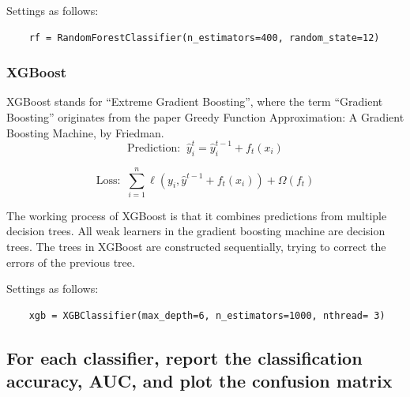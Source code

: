 \documentclass{article}
\begin{document}
Settings as follows:

\begin{lstlisting}
    rf = RandomForestClassifier(n_estimators=400, random_state=12)
\end{lstlisting}

\subsubsection{XGBoost}
XGBoost stands for “Extreme Gradient Boosting”, where the term “Gradient Boosting” originates from the paper Greedy Function Approximation: A Gradient Boosting Machine, by Friedman.
\begin{equation}
    \mbox{Prediction: } \ \hat{y}^{t}_i = \hat{y}^{t-1}_i + f_t(x_i) 
\end{equation}

\begin{equation}
    \mbox{Loss: } \ \sum^{n}_{i=1} \ell(y_i,\hat{y}^{t-1} + f_t(x_i) ) + \Omega(f_t)
\end{equation}

The working process of XGBoost is that it combines predictions from multiple decision trees. All weak learners in the gradient boosting machine are decision trees. The trees in XGBoost are constructed sequentially, trying to correct the errors of the previous tree.

Settings as follows:
\begin{lstlisting}
    xgb = XGBClassifier(max_depth=6, n_estimators=1000, nthread= 3)
\end{lstlisting}

\subsection{For each classifier, report the classification accuracy, AUC, and plot the confusion matrix}
\end{document}
